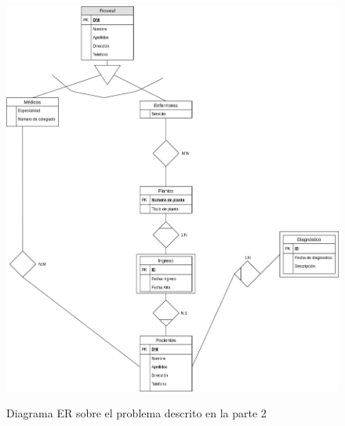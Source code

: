 \documentclass{article}
\begin{document}
\begin{figure}
\centering
\includegraphics[scale=0.5]{images/er_parte2_2.png}
\label{fig:er_parte2_2}
\caption{Diagrama ER sobre el problema descrito en la parte 2}
\end{figure}
\end{document}
